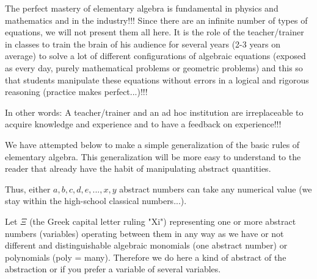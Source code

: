 	The perfect mastery of elementary algebra is fundamental in physics and mathematics and in the industry!!! Since there are an infinite number of types of equations, we will not present them all here. It is the role of the teacher/trainer in classes to train the brain of his audience for several years (2-3 years on average) to solve a lot of different configurations of algebraic equations (exposed as every day, purely mathematical problems or geometric problems) and this so that students manipulate these equations without errors in a logical and rigorous reasoning (practice makes perfect...)!!!

	In other words: A teacher/trainer and an ad hoc institution are irreplaceable to acquire knowledge and experience and to have a feedback on experience!!!

	\begin{tcolorbox}[title=Remark,colframe=black,arc=10pt]
We have attempted below to make a simple generalization of the basic rules of elementary algebra. This generalization will be more easy to understand to the reader that already have the habit of manipulating abstract quantities.
	\end{tcolorbox}	

	Thus, either $a, b, c, d, e, ..., x, y$ abstract numbers can take any numerical value (we stay within the high-school classical numbers...).

	Let $\Xi$ (the Greek capital letter ruling "Xi") representing one or more abstract numbers (variables) operating between them in any way as we have or not different and distinguishable algebraic monomials (one abstract number) or polynomials (poly = many). Therefore we do here a kind of abstract of the abstraction or if you prefer a variable of several variables.

